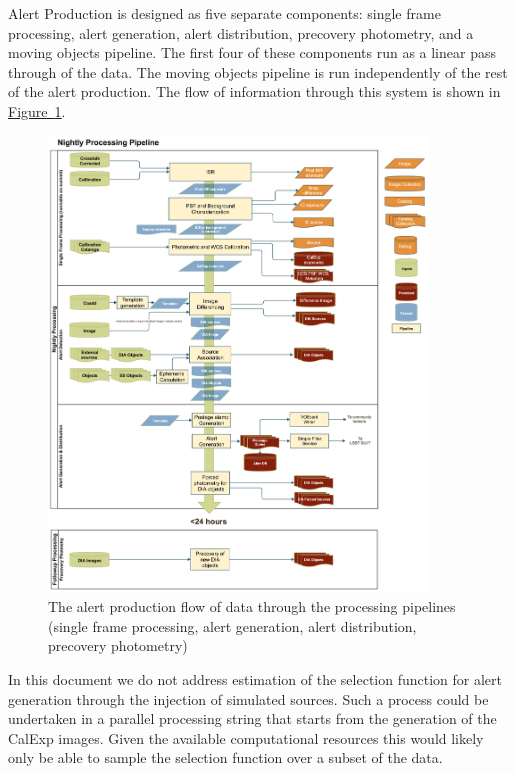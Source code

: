 Alert Production is designed as five separate components: single frame processing, alert generation, alert distribution, precovery photometry, and a moving objects pipeline. The first four of these components run as a linear pass through of the data. The moving objects pipeline is run independently of the rest of the alert production. The flow of information through this system is shown in \hyperref[fig:nightly]{Figure~\ref{fig:nightly}}.

\begin{figure}[h]
\begin{center}
\includegraphics[width=0.9\textwidth]{figures/LDM-151_Nightly_Overview.png}
\caption{\label{fig:nightly} The alert production flow of data through the processing pipelines (single frame processing, alert generation,  alert distribution, precovery photometry) }
\end{center}
\end{figure}

In this document we do not address estimation of the selection function for alert generation through the injection of simulated sources. Such a process could be undertaken in a parallel processing string that starts from the generation of the CalExp images. Given the available computational resources this would likely only be able to sample the selection function over a subset of the data.

